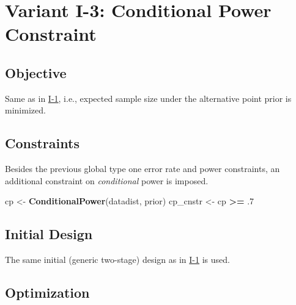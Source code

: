 \documentclass[
]{book}
\newenvironment{Shaded}{\begin{snugshade}}{\end{snugshade}}
\newcommand{\FloatTok}[1]{\textcolor[rgb]{0.00,0.00,0.81}{#1}}
\newcommand{\KeywordTok}[1]{\textcolor[rgb]{0.13,0.29,0.53}{\textbf{#1}}}
\newcommand{\NormalTok}[1]{#1}
\newcommand{\OperatorTok}[1]{\textcolor[rgb]{0.81,0.36,0.00}{\textbf{#1}}}
\newcommand{\StringTok}[1]{\textcolor[rgb]{0.31,0.60,0.02}{#1}}
\begin{document}
\hypertarget{variantI_3}{%
\section{Variant I-3: Conditional Power Constraint}\label{variantI_3}}

\hypertarget{objective-2}{%
\subsection{Objective}\label{objective-2}}

Same as in \protect\hyperlink{variantI_1}{I-1}, i.e., expected sample size under the
alternative point prior is minimized.

\hypertarget{constraints-2}{%
\subsection{Constraints}\label{constraints-2}}

Besides the previous global type one error rate and power constraints,
an additional constraint on \emph{conditional} power is imposed.

\begin{Shaded}
\begin{Highlighting}[]
\NormalTok{cp       <-}\StringTok{ }\KeywordTok{ConditionalPower}\NormalTok{(datadist, prior)}
\NormalTok{cp_cnstr <-}\StringTok{ }\NormalTok{cp }\OperatorTok{>=}\StringTok{ }\FloatTok{.7}
\end{Highlighting}
\end{Shaded}

\hypertarget{initial-design-1}{%
\subsection{Initial Design}\label{initial-design-1}}

The same initial (generic two-stage) design as in \protect\hyperlink{variantI_1}{I-1} is used.

\hypertarget{optimization-2}{%
\subsection{Optimization}\label{optimization-2}}
\end{document}
